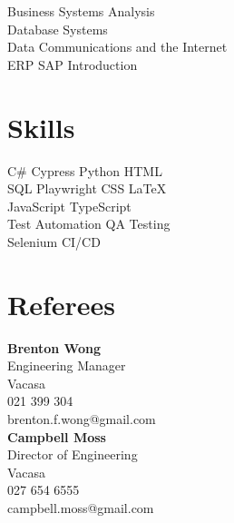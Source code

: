 \documentclass[a4paper]{deedy-resume} %
\begin{document}
\begin{minipage}[t]{0.33\textwidth}
\sectionspace %

Business Systems Analysis \\
Database Systems \\
Data Communications and the Internet \\
ERP SAP Introduction \\

\sectionspace


\sectionspace %


\section{Skills}

\smallspace %
C\# \textbullet{} Cypress \textbullet{} Python \textbullet{} HTML \\
\smallspace %
SQL \textbullet{} Playwright \textbullet{} CSS \textbullet{} \LaTeX\ \\
\smallspace %
JavaScript \textbullet{} TypeScript\\
\smallspace
Test Automation \textbullet{} QA Testing \\ 
\smallspace
Selenium \textbullet{} CI/CD 


\sectionspace %
\sectionspace %

\section{Referees} 
\textbf{Brenton Wong} \\
Engineering Manager \\
Vacasa \\
021 399 304 \\
brenton.f.wong@gmail.com \\
\smallspace
\smallspace\smallspace
\textbf{Campbell Moss} \\
Director of Engineering \\ 
Vacasa \\
027 654 6555 \\
campbell.moss@gmail.com\\



\end{minipage} %
\end{document}
